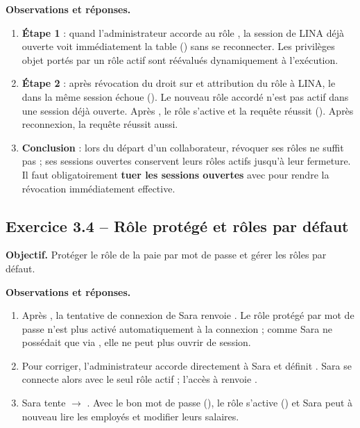 \textbf{Observations et réponses.}
\begin{enumerate}
  \item \textbf{Étape 1} : quand l'administrateur accorde  au rôle
        , la session de LINA déjà ouverte voit immédiatement la table () sans
        se reconnecter. Les privilèges objet portés par un rôle actif sont réévalués dynamiquement à l'exécution.
  \item \textbf{Étape 2} : après révocation du droit sur  et attribution du rôle
         à LINA, le  dans la même session échoue (). Le nouveau rôle
        accordé n'est pas actif dans une session déjà ouverte. Après , le rôle s'active
        et la requête réussit (). Après reconnexion, la requête réussit aussi.
  \item \textbf{Conclusion} : lors du départ d'un collaborateur, révoquer ses rôles ne suffit pas ; ses
        sessions ouvertes conservent leurs rôles actifs jusqu'à leur fermeture. Il faut obligatoirement
        \textbf{tuer les sessions ouvertes} avec  pour rendre la révocation
        immédiatement effective.
\end{enumerate}

\subsection{Exercice 3.4 -- Rôle protégé et rôles par défaut}
\textbf{Objectif.} Protéger le rôle de la paie par mot de passe et gérer les rôles par défaut.


\textbf{Observations et réponses.}
\begin{enumerate}
  \item Après , la tentative de connexion de Sara
        renvoie . Le rôle protégé par mot de passe n'est plus activé
        automatiquement à la connexion ; comme Sara ne possédait  que via
        , elle ne peut plus ouvrir de session.
  \item Pour corriger, l'administrateur accorde  directement à Sara et définit
        . Sara se connecte alors avec le seul rôle
         actif ; l'accès à  renvoie .
  \item Sara tente  $\to$ . Avec le bon mot de passe (), le rôle
        s'active () et Sara peut à nouveau lire les employés et modifier leurs salaires.
\end{enumerate}

